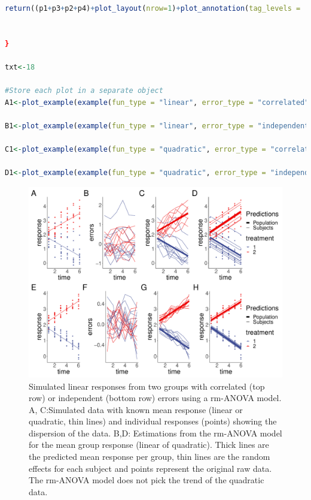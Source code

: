 \documentclass[
]{article}
\begin{document}
\begin{lstlisting}[language=R]
  return((p1+p3+p2+p4)+plot_layout(nrow=1)+plot_annotation(tag_levels = 'A')) 
  
    
}

txt<-18

#Store each plot in a separate object
A1<-plot_example(example(fun_type = "linear", error_type = "correlated")) 

B1<-plot_example(example(fun_type = "linear", error_type = "independent")) 
  
C1<-plot_example(example(fun_type = "quadratic", error_type = "correlated")) 
  
D1<-plot_example(example(fun_type = "quadratic", error_type = "independent")) 
\end{lstlisting}



\begin{figure}[H]
\includegraphics{Full_document_files/figure-latex/linear-cases-Appendix-1} \caption{Simulated linear responses from two groups with correlated (top row) or independent (bottom row) errors using a rm-ANOVA model. A, C:Simulated data with known mean response (linear or quadratic, thin lines) and individual responses (points) showing the dispersion of the data. B,D: Estimations from the rm-ANOVA model for the mean group response (linear of quadratic). Thick lines are the predicted mean response per group, thin lines are the random effects for each subject and points represent the original raw data. The rm-ANOVA model does not pick the trend of the quadratic data.}\label{fig:linear-cases-Appendix}
\end{figure}
\end{document}
